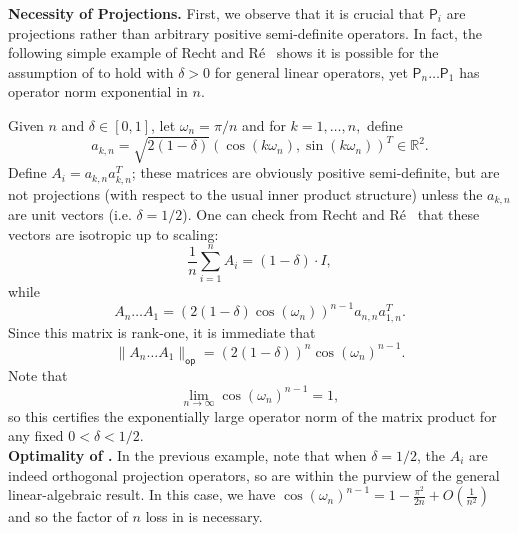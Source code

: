 \documentclass[11pt]{article}
\begin{document}
\noindent\textbf{Necessity of Projections.} First, we observe that it is crucial that $\mathsf{P}_i$ are projections rather than arbitrary positive semi-definite operators. In fact, the following simple example of Recht and R{\'{e}}~\cite{DBLP:journals/jmlr/RechtR12} shows it is possible for the assumption of  to hold with $\delta>0$ for general linear operators, yet $\mathsf{P}_n\ldots \mathsf{P}_1$ has operator norm exponential in $n$. 

Given $n$ and $\delta\in [0,1]$, let $\omega_n=\pi/n$ and for $k=1,\ldots,n,$ define
\begin{equation*}
    a_{k,n}=\sqrt{2(1-\delta)} (\cos(k\omega_n),\sin(k\omega_n))^T\in \mathbb{R}^2.
\end{equation*}
Define $A_i=a_{k,n}a_{k,n}^T$; these matrices are obviously positive semi-definite, but are not projections (with respect to the usual inner product structure) unless the $a_{k,n}$ are unit vectors (i.e. $\delta=1/2$). One can check from Recht and R{\'{e}}~\cite{DBLP:journals/jmlr/RechtR12} that these vectors are isotropic up to scaling:
    \begin{equation*}
        \frac{1}{n}\sum_{i=1}^n A_i = (1-\delta)\cdot I,
    \end{equation*}
    while 
    \begin{equation*}
        A_n\ldots A_1=(2(1-\delta)\cos(\omega_n))^{n-1}a_{n,n}a_{1,n}^T.
    \end{equation*}
    Since this matrix is rank-one, it is immediate that 
    \begin{equation*}
    \|A_n\ldots A_1\|_{\mathsf{op}} = (2(1-\delta))^n\cos(\omega_n)^{n-1}.
    \end{equation*}
    Note that
    \begin{equation*}
        \lim_{n\to \infty} \cos(\omega_n)^{n-1}=1,
    \end{equation*}
    so this certifies the exponentially large operator norm of the matrix product for any fixed $0<\delta<1/2$. \\
    
    \noindent\textbf{Optimality of .} In the previous example, note that when $\delta=1/2$, the $A_i$ are indeed orthogonal projection operators, so are within the purview of the general linear-algebraic result. In this case, we have $\cos(\omega_n)^{n-1}=1-\frac{\pi^2}{2n}+O\left(\frac{1}{n^2}\right)$ and so the factor of $n$ loss in  is necessary.\\
\end{document}
